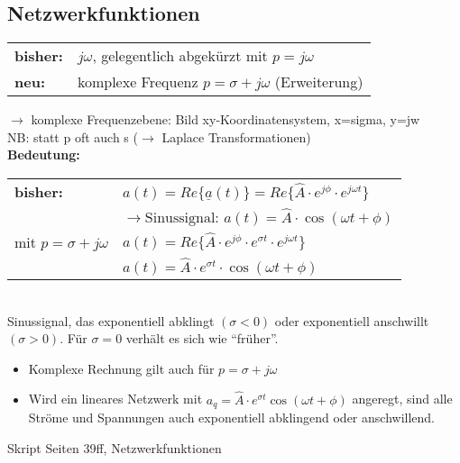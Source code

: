 \subsection{Netzwerkfunktionen}
\begin{tabular}{ll}
	\textbf{bisher:} & $j\omega$, gelegentlich abgekürzt mit $p=j\omega$ \\
	\textbf{neu:} & komplexe Frequenz $p=\sigma + j \omega$ (Erweiterung) \\
\end{tabular}
$\rightarrow$ komplexe Frequenzebene: Bild xy-Koordinatensystem, x=sigma, y=jw\\
NB: statt p oft auch s ($\rightarrow$ Laplace Transformationen)\\
\textbf{Bedeutung:}\\
\begin{tabular}{ll}
	\textbf{bisher:} & $a(t)=Re\{\underline{a}(t)\}=Re\{\hat{A}\cdot e^{j\phi}\cdot
	e^{j\omega t}\}$ \\
	& $\rightarrow \text{Sinussignal: } a(t)=\hat{A}\cdot\cos{\left(\omega t +
	\phi\right)}$\\ mit $p=\sigma+j\omega$ & $a(t)=Re\{\hat{A}\cdot e^{j\phi}\cdot
	e^{\sigma t}\cdot e^{j\omega t}\}$\\
	& $a(t)=\hat{A}\cdot e^{\sigma t} \cdot \cos{\left(\omega t + \phi\right)}$\\
\end{tabular}\\
Sinussignal, das exponentiell abklingt $(\sigma < 0)$ oder exponentiell
anschwillt $(\sigma > 0)$. Für $\sigma = 0$ verhält es sich wie "`früher"'.\\
\begin{itemize}
  \item Komplexe Rechnung gilt auch für $p=\sigma+j\omega$\\
  \item Wird ein lineares Netzwerk mit $a_q=\hat{A}\cdot e^{\sigma t}
  \cos\left(\omega t + \phi\right)$ angeregt, sind alle Ströme und Spannungen
  auch exponentiell abklingend oder anschwillend.
\end{itemize}
Skript Seiten 39ff, Netzwerkfunktionen
